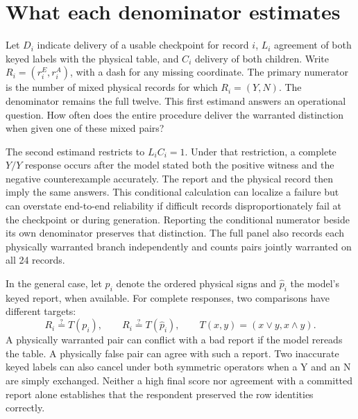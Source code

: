 \documentclass[12pt,letterpaper]{article}
\begin{document}
\section{What each denominator estimates}
Let $D_i$ indicate delivery of a usable checkpoint for record $i$, $L_i$ agreement of both keyed labels with the physical table, and $C_i$ delivery of both children. Write $R_i=(r_i^E,r_i^A)$, with a dash for any missing coordinate. The primary numerator is the number of mixed physical records for which $R_i=(Y,N)$. The denominator remains the full twelve. This first estimand answers an operational question. How often does the entire procedure deliver the warranted distinction when given one of these mixed pairs?

The second estimand restricts to $L_i C_i=1$. Under that restriction, a complete $Y/Y$ response occurs after the model stated both the positive witness and the negative counterexample accurately. The report and the physical record then imply the same answers. This conditional calculation can localize a failure but can overstate end-to-end reliability if difficult records disproportionately fail at the checkpoint or during generation. Reporting the conditional numerator beside its own denominator preserves that distinction. The full panel also records each physically warranted branch independently and counts pairs jointly warranted on all 24 records.

In the general case, let $p_i$ denote the ordered physical signs and $\hat p_i$ the model's keyed report, when available. For complete responses, two comparisons have different targets:
\[
       R_i\overset{?}=T(p_i),\qquad R_i\overset{?}=T(\hat p_i),
       \qquad T(x,y)=(x\lor y,x\land y).
\]
A physically warranted pair can conflict with a bad report if the model rereads the table. A physically false pair can agree with such a report. Two inaccurate keyed labels can also cancel under both symmetric operators when a Y and an N are simply exchanged. Neither a high final score nor agreement with a committed report alone establishes that the respondent preserved the row identities correctly.
\end{document}
